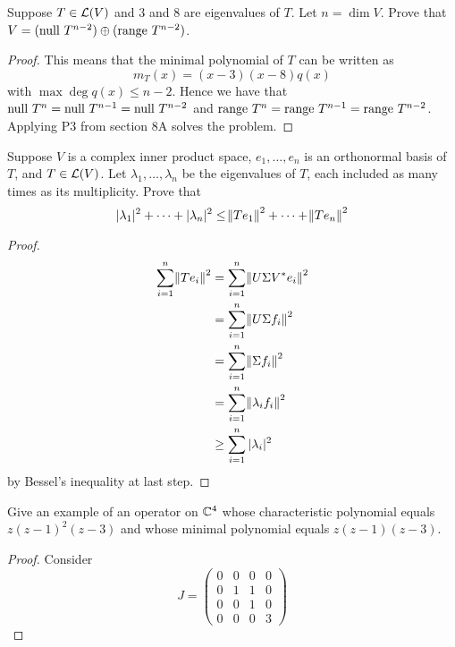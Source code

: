 \documentclass{extarticle}
\begin{document}
\begin{problem}{5}
    Suppose \(T \in \mathcal{L}(V)\) and 3 and 8 are eigenvalues of \(T\). Let \(n = \dim V\). Prove that 
    \(V = (\text{null } T^{n-2}) \oplus (\text{range } T^{n-2})\). 
\end{problem}


\begin{proof}
This means that the minimal polynomial of \(T\) can be written as 
\[m_T(x) = (x-3)(x-8)q(x)\]
with \(\max \deg q(x) \leq n-2\). Hence we have that \(\text{null } T^{n} = \text{null } T^{n-1} = \text{null } T^{n-2}\) and 
\(\text{range } T^{n} = \text{range } T^{n-1} = \text{range } T^{n-2}\). Applying P3 from section 8A solves the problem. 
\end{proof}

\begin{problem}{10}
    Suppose \(V\) is a complex inner product space, \(e_1, \ldots, e_n\) is an orthonormal basis of \(T\), 
    and \(T \in \mathcal{L}(V)\). Let \(\lambda_1, \ldots, \lambda_n\) be the eigenvalues of \(T\), each included 
    as many times as its multiplicity. Prove that 
    \[|\lambda_1|^2 + \cdots + |\lambda_n|^2 \leq \norm{T e_1}^2 + \cdots + \norm{T e_n}^2\]
\end{problem}

\begin{proof}

\begin{align*}
    \sum_{i=1}^{n}\norm{T e_i}^2 
    &= \sum_{i=1}^{n}\norm{U \Sigma V^* e_i}^2  \\ 
    &= \sum_{i=1}^{n}\norm{U \Sigma f_i}^2 \\ 
    &= \sum_{i=1}^{n}\norm{\Sigma f_i}^2 \\  
    &= \sum_{i=1}^{n} \norm{\lambda_i f_i}^2 \\ 
    &\geq \sum_{i=1}^{n} |\lambda_i|^2
\end{align*}
by Bessel's inequality at last step. 
\end{proof}


\begin{problem}{14}
    Give an example of an operator on \(\mathbb{C}^4\) whose characteristic polynomial equals 
    \(z(z-1)^2 (z-3)\) and whose minimal polynomial equals \(z(z - 1) (z-3)\).
\end{problem}

\begin{proof}
Consider 
\[
J = \begin{pmatrix}
0 & 0 & 0 & 0 \\
0 & 1 & 1 & 0 \\
0 & 0 & 1 & 0 \\
0 & 0 & 0 & 3
\end{pmatrix}
\]
\end{proof}
\end{document}
